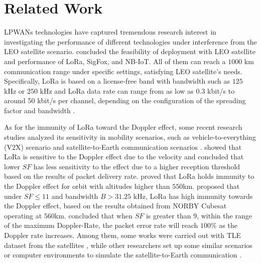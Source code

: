 \section{Related Work}
LPWANs technologies have captured tremendous research interest in investigating the performance of different technologies under interference from the LEO satellite scenario. \cite{temim2022low,wang2022performance} concluded the feasibility of deployment with LEO satellite and performance of LoRa, SigFox, and NB-IoT. All of them can reach a $1000$ km communication range under specific settings, satisfying LEO satellite's needs. Specifically, LoRa is based on a license-free band with bandwidth such as $125$ kHz or $250$ kHz and LoRa data rate can range from as low as 0.3 kbit/s to around 50 kbit/s per channel, depending on the configuration of the spreading factor and bandwidth \cite{LoRaAlliance2020}.

As for the immunity of LoRa toward the Doppler effect, some recent research studies analyzed its sensitivity in mobility scenarios, such as vehicle-to-everything (V2X) scenario \cite{torres2021experimental, li2018lora}
and satellite-to-Earth communication scenarios \cite{doroshkin2018laboratory,doroshkin2019experimental,zadorozhny2022first,cao2021influence,colombo2022low,ameloot2021characterizing,ullah2023understanding,lapapan2021lora,ben2022new,kang2022regression}.  
\cite{torres2021experimental, li2018lora} showed that LoRa is sensitive to the Doppler effect due to the velocity and concluded that lower $SF$ has less sensitivity to the effect due to a higher reception threshold based on the results of packet delivery rate.
\cite{doroshkin2018laboratory,doroshkin2019experimental} proved that LoRa holds immunity to the Doppler effect for orbit with altitudes higher than $550$km. \cite{zadorozhny2022first} proposed that under $SF \leq 11$ and bandwidth $B> 31.25$ kHz, LoRa has high immunity towards the Doppler effect, based on the results obtained from NORBY Cubesat operating at $560$km.
\cite{cao2021influence} concluded that when $SF$ is greater than $9$, within the range of the maximum Doppler-Rate, the packet error rate will reach $100$\% as the Doppler rate increases.  
Among them, some works were carried out with TLE dataset from the satellites \cite{zadorozhny2022first}, while other researchers set up some similar scenarios or computer environments to simulate the satellite-to-Earth communication \cite{doroshkin2018laboratory,doroshkin2019experimental,cao2021influence}.

